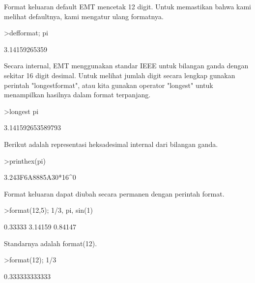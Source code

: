 \begin{eulernotebook}
\begin{eulercomment}
Format keluaran default EMT mencetak 12 digit. Untuk memastikan bahwa
kami melihat defaultnya, kami mengatur ulang formatnya.
\end{eulercomment}
\begin{eulerprompt}
>defformat; pi
\end{eulerprompt}
\begin{euleroutput}
  3.14159265359
\end{euleroutput}
\begin{eulercomment}
Secara internal, EMT menggunakan standar IEEE untuk bilangan ganda
dengan sekitar 16 digit desimal. Untuk melihat jumlah digit secara
lengkap gunakan perintah "longestformat", atau kita gunakan operator
"longest" untuk menampilkan hasilnya dalam format terpanjang.
\end{eulercomment}
\begin{eulerprompt}
>longest pi
\end{eulerprompt}
\begin{euleroutput}
        3.141592653589793 
\end{euleroutput}
\begin{eulercomment}
Berikut adalah representasi heksadesimal internal dari bilangan ganda.
\end{eulercomment}
\begin{eulerprompt}
>printhex(pi)
\end{eulerprompt}
\begin{euleroutput}
  3.243F6A8885A30*16^0
\end{euleroutput}
\begin{eulercomment}
Format keluaran dapat diubah secara permanen dengan perintah format.
\end{eulercomment}
\begin{eulerprompt}
>format(12,5); 1/3, pi, sin(1)
\end{eulerprompt}
\begin{euleroutput}
      0.33333 
      3.14159 
      0.84147 
\end{euleroutput}
\begin{eulercomment}
Standarnya adalah format(12).
\end{eulercomment}
\begin{eulerprompt}
>format(12); 1/3
\end{eulerprompt}
\begin{euleroutput}
  0.333333333333
\end{euleroutput}
\begin{eulercomment}

\end{eulercomment}
\end{eulernotebook}
